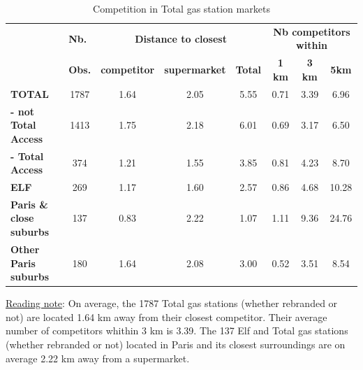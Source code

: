 \documentclass[english]{article}
\begin{document}
\begin{table}
\caption{Competition in Total gas station markets}
\label{tab:competitiveness_total_markets_stats}
\begin{threeparttable}
\begin{tabular}{lccccccc}
\hline
\hline
& \multicolumn{1}{l}{\textbf{Nb.}} & \multicolumn{3}{c}{\textbf{Distance to closest}} & \multicolumn{3}{c}{\textbf{Nb competitors within}}  \tabularnewline \cmidrule(l{2pt}r{2pt}){3-5} \cmidrule(l{2pt}r{2pt}){6-8}
& \multicolumn{1}{l}{\textbf{Obs.}} & \textbf{competitor}{ } & \textbf{supermarket}{ } & \textbf{Total}{ } & \textbf{1 km}{ } & \textbf{3 km}{ } & \textbf{ 5km }\tabularnewline
\hline
\textbf{TOTAL}{ } & {1787 } & {1.64 } & {2.05 } & {5.55 } & {0.71 } & {3.39 } & {6.96 }\tabularnewline
\textbf{- not Total Access}{ } & {1413 } & {1.75 } & {2.18 } & {6.01 } & {0.69 } & {3.17 } & {6.50 }\tabularnewline
\textbf{- Total Access}{ } & {374 } & {1.21 } & {1.55 } & {3.85 } & {0.81 } & {4.23 } & {8.70 }\tabularnewline
\hline
\textbf{ELF}{ } & {269 } & {1.17 } & {1.60 } & {2.57 } & {0.86 } & {4.68 } & {10.28 }\tabularnewline
\hline
\textbf{Paris \& close suburbs}{ } & {137 } & {0.83 } & {2.22 } & {1.07 } & {1.11 } & {9.36 } & {24.76}\tabularnewline
\textbf{Other Paris suburbs}{ } & {180 } & {1.64 } & {2.08 } & {3.00 } & {0.52 } & {3.51 } & {8.54}\tabularnewline
\hline
\hline
\end{tabular}
\end{threeparttable}
\parbox{\textwidth}{\footnotesize%
\vspace{2eX} %
{\footnotesize{}\uline{Reading note}}{\footnotesize{}: }On average, the 1787 Total gas stations (whether rebranded or not) are located 1.64 km away from their closest competitor. Their average number of competitors whithin 3 km is 3.39. The 137 Elf and Total gas stations (whether rebranded or not) located in Paris and its closest surroundings are on average 2.22 km away from a supermarket.}
\end{table}
\end{document}
